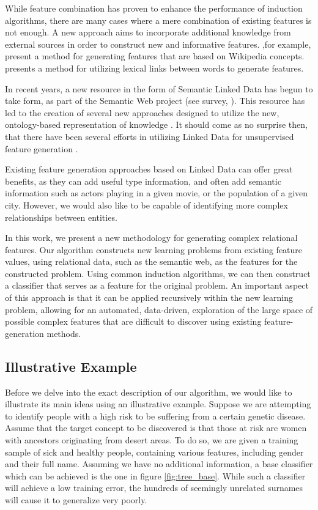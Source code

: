 \documentclass[twoside,11pt]{article}
\theoremstyle{definition}
\begin{document}
While feature combination has proven to enhance the performance of induction algorithms, there are many cases where a mere combination of existing features is not enough. A new approach aims to incorporate additional knowledge from external sources in order to construct new and informative features.
 ,for example, present a method for generating features that are based on Wikipedia concepts.  presents a method for utilizing lexical links between words to generate features.

In recent years, a new resource in the form of Semantic Linked Data has begun to take form, as part of the Semantic Web project (see survey, ). This resource has led to the creation of several new approaches designed to utilize the new, ontology-based representation of knowledge \cite{losch2012graph,rios2014statistical}.
It should come as no surprise then, that there have been several efforts in utilizing Linked Data for unsupervised feature generation \cite{cheng2011automatedfull,paulheim2012unsupervisedfull}.

Existing feature generation approaches based on Linked Data can offer great benefits, as they can add useful type information, and often add semantic information such as actors playing in a given movie, or the population of a given city.
However, we would also like to be capable of identifying more complex relationships between entities.

In this work, we present a new methodology for generating complex relational features.  Our algorithm constructs new learning problems from existing feature values, using relational data, such as the semantic web, as the features for the constructed problem.
Using common induction algorithms, we can then construct a classifier that serves as a feature for the original problem. An important aspect of this approach is that it can be applied recursively within the new learning problem, allowing for an automated, data-driven, exploration of the large space of possible  complex features that are difficult to discover using existing feature-generation methods.

\subsection{Illustrative Example}

Before we delve into the exact description of our algorithm, we would like to illustrate its main ideas using an illustrative example.
Suppose we are attempting to identify people with a high risk to be suffering from a certain genetic disease. Assume that the target concept to be discovered is that those at risk are women with ancestors originating from desert areas. To do so, we are given a training sample of sick and healthy people, containing various features, including gender and their full name.
Assuming we have no additional information, a base classifier which can be achieved is the one in figure \ref{fig:tree_base}. While such a classifier will achieve a low training error, the hundreds of seemingly unrelated surnames will cause it to generalize very poorly.
\end{document}
